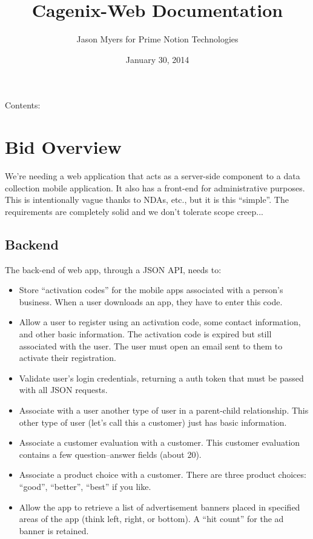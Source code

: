 \documentclass[letterpaper,10pt,english]{sphinxmanual}
\title{Cagenix-Web Documentation}
\date{January 30, 2014}
\author{Jason Myers for Prime Notion Technologies}
\begin{document}
\maketitle
\tableofcontents
{}\label{index::doc}


Contents:


\chapter{Bid Overview}
\label{dev-bid:welcome-to-cagenix-web-s-documentation}\label{dev-bid::doc}\label{dev-bid:bid-overview}
We’re needing a web application that acts as a server-side component to a data collection mobile application. It also has a front-end for administrative purposes. This is intentionally vague thanks to NDAs, etc., but it is this “simple”. The requirements are completely solid and we don’t tolerate scope creep...


\section{Backend}
\label{dev-bid:backend}
The back-end of web app, through a JSON API, needs to:
\begin{itemize}
\item {} 
Store “activation codes” for the mobile apps associated with a person’s business. When a user downloads an app, they have to enter this code.

\item {} 
Allow a user to register using an activation code, some contact information, and other basic information. The activation code is expired but still associated with the user. The user must open an email sent to them to activate their registration.

\item {} 
Validate user’s login credentials, returning a auth token that must be passed with all JSON requests.

\item {} 
Associate with a user another type of user in a parent-child relationship. This other type of user (let’s call this a customer) just has basic information.

\item {} 
Associate a customer evaluation with a customer. This customer evaluation contains a few question–answer fields (about 20).

\item {} 
Associate a product choice with a customer. There are three product choices: “good”, “better”, “best” if you like.

\item {} 
Allow the app to retrieve a list of advertisement banners placed in specified areas of the app (think left, right, or bottom). A “hit count” for the ad banner is retained.

\end{itemize}
\end{document}
